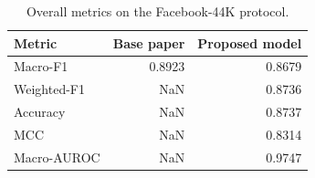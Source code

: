\begin{table}
\caption{Overall metrics on the Facebook-44K protocol.}
\label{tab:basepaper_metrics}
\begin{tabular}{lrr}
\toprule
Metric & Base paper & Proposed model \\
\midrule
Macro-F1 & 0.8923 & 0.8679 \\
Weighted-F1 & NaN & 0.8736 \\
Accuracy & NaN & 0.8737 \\
MCC & NaN & 0.8314 \\
Macro-AUROC & NaN & 0.9747 \\
\bottomrule
\end{tabular}
\end{table}
